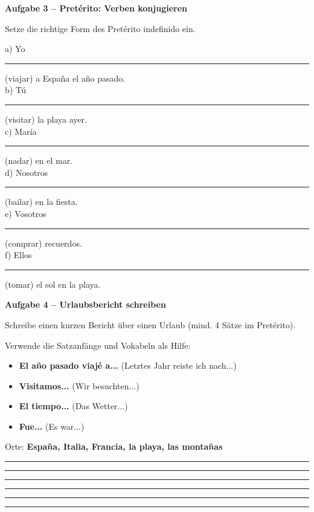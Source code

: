 \documentclass[11pt, a4paper]{article}
\newcommand{\fachfarbe}{spanisch}
\newcommand{\punktebox}[1]{\hfill\fbox{\small \_/#1}}
\newcommand{\luecke}[1]{\rule{#1}{0.4pt}}
\newenvironment{aufgabe}[1]{%
    \needspace{5\baselineskip}%
    \nopagebreak[4]%
    \vspace{10pt}
    \noindent\textbf{\textcolor{\fachfarbe}{Aufgabe #1}}
    \nopagebreak[4]%
    \vspace{5pt}
    \nopagebreak[4]%
    \begin{list}{}{\leftmargin=0pt}
    \item[]
}{%
    \end{list}
}
\newcommand{\es}[1]{\textcolor{\fachfarbe}{\textbf{#1}}}
\begin{document}
\begin{aufgabe}{3 -- Pretérito: Verben konjugieren}
Setze die richtige Form des Pretérito indefinido ein. \punktebox{6}
\end{aufgabe}

\noindent
a) Yo \luecke{3cm} (viajar) a España el año pasado. \\[0.8em]
b) Tú \luecke{3cm} (visitar) la playa ayer. \\[0.8em]
c) María \luecke{3cm} (nadar) en el mar. \\[0.8em]
d) Nosotros \luecke{3cm} (bailar) en la fiesta. \\[0.8em]
e) Vosotros \luecke{3cm} (comprar) recuerdos. \\[0.8em]
f) Ellos \luecke{3cm} (tomar) el sol en la playa.

\vspace{15pt}


\begin{aufgabe}{4 -- Urlaubsbericht schreiben}
Schreibe einen kurzen Bericht über einen Urlaub (mind. 4 Sätze im Pretérito). \punktebox{6}
\end{aufgabe}

\begin{hinweis}
Verwende die Satzanfänge und Vokabeln als Hilfe:

\begin{itemize}[nosep]
    \item \es{El año pasado viajé a...} (Letztes Jahr reiste ich nach...)
    \item \es{Visitamos...} (Wir besuchten...)
    \item \es{El tiempo...} (Das Wetter...)
    \item \es{Fue...} (Es war...)
\end{itemize}

Orte: \es{España, Italia, Francia, la playa, las montañas}
\end{hinweis}

\vspace{0.5em}

\noindent\rule{\textwidth}{0.4pt}\vspace{8pt}
\noindent\rule{\textwidth}{0.4pt}\vspace{8pt}
\noindent\rule{\textwidth}{0.4pt}\vspace{8pt}
\noindent\rule{\textwidth}{0.4pt}\vspace{8pt}
\noindent\rule{\textwidth}{0.4pt}\vspace{8pt}
\noindent\rule{\textwidth}{0.4pt}
\end{document}
